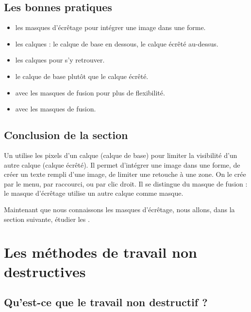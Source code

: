 \subsection{Les bonnes pratiques}

\begin{itemize}
    \item {} les masques d'écrêtage pour intégrer une image dans une forme.
    \item {} les calques : le calque de base en dessous, le calque écrêté au-dessus.
    \item {} les calques pour s'y retrouver.
    \item {} le calque de base plutôt que le calque écrêté.
    \item {} avec les masques de fusion pour plus de flexibilité.
    \item {} avec les masques de fusion.
\end{itemize}

\subsection*{Conclusion de la section}

Un  utilise les pixels d'un calque (calque de base) pour limiter la visibilité d'un autre calque (calque écrêté). Il permet d'intégrer une image dans une forme, de créer un texte rempli d'une image, de limiter une retouche à une zone. On le crée par le menu, par raccourci, ou par clic droit. Il se distingue du masque de fusion : le masque d'écrêtage utilise un autre calque comme masque.

Maintenant que nous connaissons les masques d'écrêtage, nous allons, dans la section suivante, étudier les .

\section{Les méthodes de travail non destructives}

\subsection{Qu'est-ce que le travail non destructif ?}

